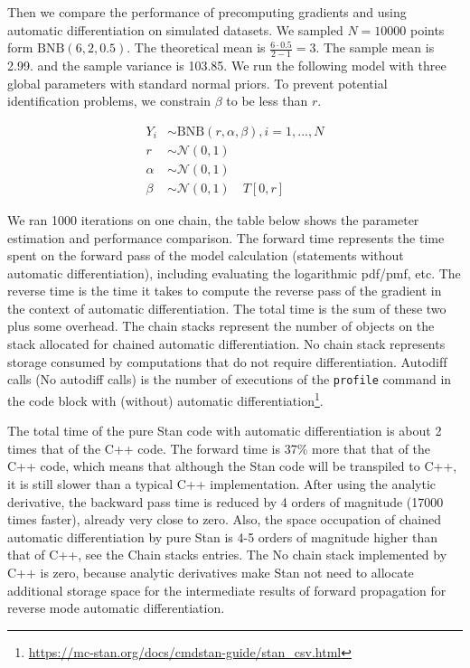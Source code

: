 \documentclass[11pt]{article}
\begin{document}
Then we compare the performance of precomputing gradients and using automatic differentiation on simulated datasets. We sampled $N=10000$ points form $\text{BNB}(6,2,0.5)$. The theoretical mean is $\frac{6\cdot 0.5}{2-1}=3$. The sample mean is 2.99.  and the sample variance is 103.85.  We run the following model with three global parameters with standard normal priors. To prevent potential identification problems, we constrain $\beta$ to be less than $r$.

\begin{equation}
  \begin{aligned}
	Y_{i} &\sim \text{BNB}(r, \alpha, \beta), i=1,...,N\\
	r &\sim \mathcal{N}(0,1) \\
	\alpha &\sim \mathcal{N}(0,1) \\ 
	\beta &\sim \mathcal{N}(0,1) \quad T[0,r]
  \end{aligned}
\end{equation}

We ran 1000 iterations on one chain, the table below shows the parameter estimation and performance comparison. The forward time represents the time spent on the forward pass of the model calculation (statements without automatic differentiation), including evaluating the logarithmic pdf/pmf, etc. The reverse time is the time it takes to compute the reverse pass of the gradient in the context of automatic differentiation. The total time is the sum of these two plus some overhead. The chain stacks represent the number of objects on the stack allocated for chained automatic differentiation. No chain stack represents storage consumed by computations that do not require differentiation. Autodif‌f calls (No autodiff calls) is the number of executions of the \verb|profile| command in the code block with (without) automatic differentiation\footnote{\url{https://mc-stan.org/docs/cmdstan-guide/stan_csv.html}}.



The total time of the pure Stan code with automatic differentiation is about 2 times that of the C++ code. The forward time is 37\% more that that of the C++ code, which means that although the Stan code will be transpiled to C++, it is still slower than a typical C++ implementation. After using the analytic derivative, the backward pass time is reduced by 4 orders of magnitude (17000 times faster), already very close to zero. Also, the space occupation of chained automatic differentiation by pure Stan is 4-5 orders of magnitude higher than that of C++, see the Chain stacks entries. The No chain stack implemented by C++ is zero, because analytic derivatives make Stan not need to allocate additional storage space for the intermediate results of forward propagation for reverse mode automatic differentiation. 
\end{document}
